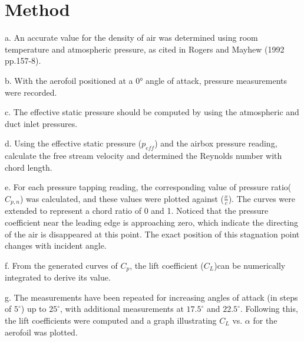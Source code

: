 \section{Method}
\FloatBarrier %

a. An accurate value for the density of air was determined using room temperature and atmospheric pressure, as cited in Rogers and Mayhew (1992 pp.157-8).

b. With the aerofoil positioned at a 0° angle of attack, pressure measurements were recorded.

c. The effective static pressure should be computed by using the atmospheric and duct inlet pressures.

d. Using the effective static pressure ($p_{eff}$) and the airbox pressure reading, calculate the free stream velocity and determined the Reynolds number with chord length. 

e. For each pressure tapping reading, the corresponding value of pressure ratio($C_{p,n}$) was calculated, and these values were plotted against ($\frac{x}{c}$). The curves were extended to represent a chord ratio of 0 and 1. Noticed that the pressure coefficient near the leading edge is approaching zero, which indicate the directing of the air is disappeared at this point. The exact position of this stagnation point changes with incident angle.

f. From the generated curves of $C_p$, the lift coefficient ($C_L$)can be numerically integrated to derive its value.

g. The measurements have been repeated for increasing angles of attack (in steps of $5^\circ$) up to $25^\circ$, with additional measurements at $17.5^\circ$ and $22.5^\circ$.
Following this, the lift coefficients were computed and a graph illustrating $C_L$ vs. $\alpha$ for the aerofoil was plotted.